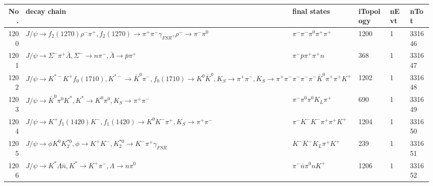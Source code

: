 \begin{table}[htbp] 
\begin{center}
\begin{small}
\begin{tabular}{rlllll}\hline\hline
 No. & decay chain & final states &  iTopology & nEvt & nTot \\\hline
1200&$J/\psi       \rightarrow f_{2}(1270)    \rho^{-}      \pi^{+}        , f_{2}(1270)     \rightarrow \pi^{+}        \pi^{-}        \gamma_{FSR} , \rho^{-}       \rightarrow \pi^{-}        \pi^{0}        $&$\pi^{-}        \pi^{-}        \pi^{0}        \pi^{+}        \pi^{+}        $& 1200&    1&331646\\
1201&$J/\psi       \rightarrow \Sigma^-          \pi^{+}        \bar{\Lambda}    , \Sigma^-           \rightarrow n                 \pi^{-}        , \bar{\Lambda}     \rightarrow \bar{p}          \pi^{+}        $&$\pi^{-}        \bar{p}          \pi^{+}        \pi^{+}        n                 $&  368&    1&331647\\
1202&$J/\psi       \rightarrow K^{*-}         K^{+}          f_{0}(1710)    , K^{*-}          \rightarrow \bar{K}^{0}   \pi^{-}        , f_{0}(1710)     \rightarrow K^{0}          \bar{K}^{0}   , K_{S}           \rightarrow \pi^{+}        \pi^{-}        , K_{S}           \rightarrow \pi^{+}        \pi^{-}        $&$\pi^{-}        \pi^{-}        \pi^{-}        \bar{K}^{0}   \pi^{+}        \pi^{+}        K^{+}          $& 1202&    1&331648\\
1203&$J/\psi       \rightarrow \bar{K}^{0}   \pi^{0}        K^{*}          , K^{*}           \rightarrow K^{0}          \pi^{0}        , K_{S}           \rightarrow \pi^{+}        \pi^{-}        $&$\pi^{-}        \pi^{0}        \pi^{0}        K_{L}          \pi^{+}        $&  690&    1&331649\\
1204&$J/\psi       \rightarrow K^{+}          f_{1}(1420)    K^{-}          , f_{1}(1420)     \rightarrow K^{0}          K^{-}          \pi^{+}        , K_{S}           \rightarrow \pi^{+}        \pi^{-}        $&$\pi^{-}        K^{-}          K^{-}          \pi^{+}        \pi^{+}        K^{+}          $& 1204&    1&331650\\
1205&$J/\psi       \rightarrow \phi           K^{0}          K_2^{*0}       , \phi            \rightarrow K^{+}          K^{-}          , K_2^{*0}        \rightarrow K^{-}          \pi^{+}        \gamma_{FSR} $&$K^{-}          K^{-}          K_{L}          \pi^{+}        K^{+}          $&  239&    1&331651\\
1206&$J/\psi       \rightarrow K^{*}          \Lambda           \bar{n}          , K^{*}           \rightarrow K^{+}          \pi^{-}        , \Lambda            \rightarrow n                 \pi^{0}        $&$\pi^{-}        \bar{n}          \pi^{0}        n                 K^{+}          $& 1206&    1&331652\\

\end{tabular}
\end{small}
\end{center}
\end{table}

